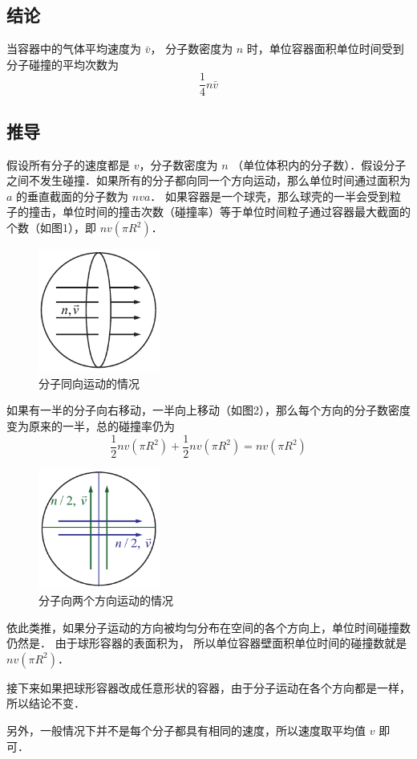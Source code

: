 
\subsection{结论}

当容器中的气体平均速度为 $\bar v$， 分子数密度为 $n$ 时，单位容器面积单位时间受到分子碰撞的平均次数为
\begin{equation}
\frac{1}{4}n\bar v
\end{equation}
\subsection{推导}

假设所有分子的速度都是 $v$，分子数密度为 $n$ （单位体积内的分子数）．假设分子之间不发生碰撞．如果所有的分子都向同一个方向运动，那么单位时间通过面积为 $a$ 的垂直截面的分子数为 $nva$． 如果容器是一个球壳，那么球壳的一半会受到粒子的撞击，单位时间的撞击次数（碰撞率）等于单位时间粒子通过容器最大截面的个数（如图1），即 $nv\left( {\pi {R^2}} \right)$． 
\begin{figure}[ht]
\centering
\includegraphics[width=4cm]{./figures/AvgHit1.pdf}
\caption{分子同向运动的情况} \label{Sample_fig1}
\end{figure}
如果有一半的分子向右移动，一半向上移动（如图2），那么每个方向的分子数密度变为原来的一半，总的碰撞率仍为
\begin{equation}
\frac{1}{2}nv\left( {\pi {R^2}} \right) + \frac{1}{2}nv\left( {\pi {R^2}} \right) = nv\left( {\pi {R^2}} \right)
\end{equation}

\begin{figure}[ht]
\centering
\includegraphics[width=4cm]{./figures/AvgHit2.pdf}
\caption{分子向两个方向运动的情况} \label{Sample_fig1}
\end{figure}
依此类推，如果分子运动的方向被均匀分布在空间的各个方向上，单位时间碰撞数仍然是．
由于球形容器的表面积为， 所以单位容器壁面积单位时间的碰撞数就是 $nv\left( {\pi {R^2}} \right)$． 

接下来如果把球形容器改成任意形状的容器，由于分子运动在各个方向都是一样，所以结论不变．

另外，一般情况下并不是每个分子都具有相同的速度，所以速度取平均值 $v$ 即可．

